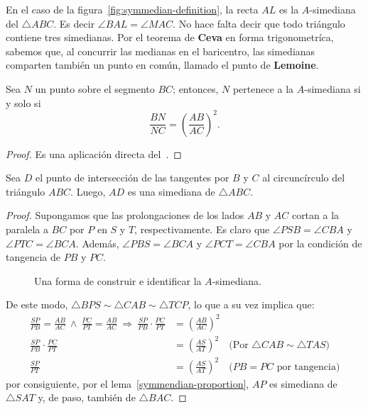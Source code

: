 En el caso de la figura~\ref{fig:symmedian-definition}, la recta $AL$ es la $A$-simediana del $\triangle ABC$.
Es decir $\angle BAL = \angle MAC$.
No hace falta decir que todo triángulo contiene tres simedianas.
Por el teorema de \textbf{Ceva} en forma trigonometríca, sabemos que, al concurrir las medianas en el baricentro, las simedianas comparten también un punto en común, llamado el punto de \textbf{Lemoine}.


\begin{section-lemma.tcb}\label{symmendian-proportion}
    Sea $N$ un punto sobre el segmento $BC$; entonces, $N$ pertenece a la $A$\nobreakdash-simediana si y solo si
    \[
        \frac{BN}{NC} = \left(\frac{AB}{AC}\right)^2.
    \]
\end{section-lemma.tcb}
\begin{proof}
    Es una aplicación directa del~.
\end{proof}


\begin{section-lemma.tcb}\label{simedian-lemma}
    Sea $D$ el punto de intersección de las tangentes por $B$ y $C$ al circuncírculo del triángulo $ABC$.
    Luego, $AD$ es una simediana de $\triangle ABC$.
\end{section-lemma.tcb}
\begin{proof}
    Supongamos que las prolongaciones de los lados $AB$ y $AC$ cortan a la paralela a $BC$ por $P$ en $S$ y $T$, respectivamente.
    Es claro que $\angle PSB = \angle CBA$ y $\angle PTC = \angle BCA$.
    Además, $\angle PBS = \angle BCA$ y $\angle PCT = \angle CBA$ por la condición de tangencia de $PB$ y $PC$.

    \begin{figure}[H]
        \centering
        
        \caption{Una forma de construir e identificar la $A$-simediana.}
    \end{figure}

    De este modo, $\triangle BPS \sim \triangle CAB \sim \triangle TCP$, lo que a su vez implica que:
    \begin{align*}
        \frac{SP}{PB} = \frac{AB}{AC} \ \land \ \frac{PC}{PT} = \frac{AB}{AC}
        \ \Rightarrow \ \frac{SP}{PB} \cdot \frac{PC}{PT} &= \left(\frac{AB}{AC}\right)^2\\
        \frac{SP}{PB} \cdot \frac{PC}{PT} &= \left(\frac{AS}{AT}\right)^2 \quad \text{(Por $\triangle CAB \sim \triangle TAS$)}\\
        \frac{SP}{PT}  &= \left(\frac{AS}{AT}\right)^2 \quad \text{($PB = PC$ por tangencia)}
    \end{align*}
    por consiguiente, por el lema~\ref{symmendian-proportion}, $AP$ es simediana de $\triangle SAT$ y, de paso, también de $\triangle BAC$.
\end{proof}


